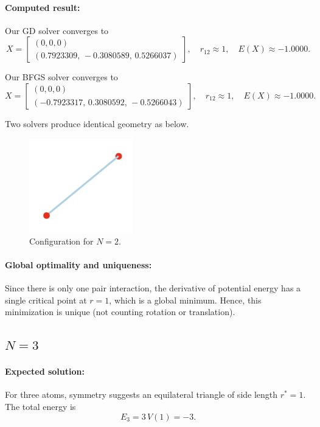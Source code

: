 \documentclass[11pt,onecolumn]{article}
\begin{document}
\paragraph{Computed result:}
Our GD solver converges to
\[
  X =
  \begin{bmatrix}
    (0,0,0) \\[3pt]
    (0.7923309,\,-0.3080589,\,0.5266037)
  \end{bmatrix}, \quad
  r_{12} \approx 1,
  \quad
  E(X) \approx -1.0000.
\]


Our BFGS solver converges to
\[
  X =
  \begin{bmatrix}
    (0,0,0) \\[3pt]
    (-0.7923317,\,0.3080592,\,-0.5266043)
  \end{bmatrix}, \quad
  r_{12} \approx 1,
  \quad
  E(X) \approx -1.0000.
\]

Two solvers produce identical geometry as below.
\begin{figure}[h]
  \centering
  \includegraphics[width=0.4\textwidth]{N2.png}
  \caption{Configuration for \(N=2\).}
\end{figure}

\paragraph{Global optimality and uniqueness:}  
Since there is only one pair interaction, the derivative of potential energy has a single critical point at \(r=1\), which is a global minimum.  Hence, this minimization is unique (not counting rotation or translation).

\subsection{\(N=3\)}

\paragraph{Expected solution:}  
For three atoms, symmetry suggests an equilateral triangle of side length \(r^*=1\).  The total energy is
\[
  E_3 = 3\,V(1) = -3.
\]
\end{document}
